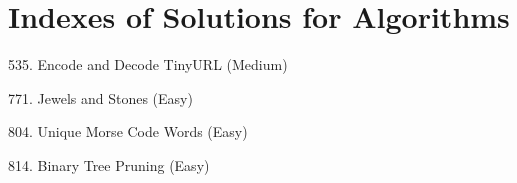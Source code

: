 \tocless\section{Indexes of Solutions for Algorithms}
\label{sec:algo_ind}

\begin{flushleft}
535. Encode and Decode TinyURL (Medium)\hfill\pageref{algo:535}

771. Jewels and Stones (Easy)\hfill\pageref{algo:771}

804. Unique Morse Code Words (Easy)\hfill\pageref{algo:804}

814. Binary Tree Pruning (Easy)\hfill\pageref{algo:814}
\end{flushleft}

\newpage
